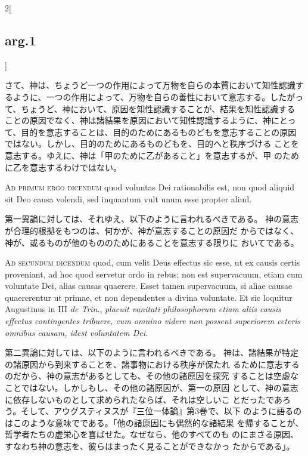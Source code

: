 \documentclass[paper=a4paper,fontsize=10pt,jafontsize=9pt,titlepage]{jlreq}
\begin{document}
\begin{paracol}{2}[\subsection{arg.1}]
\switchcolumn

さて、神は、ちょうど一つの作用によって万物を自らの本質において知性認識す
 るように、一つの作用によって、万物を自らの善性において意志する。したがっ
 て、ちょうど、神において、原因を知性認識することが、結果を知性認識する
 ことの原因でなく、神は諸結果を原因において知性認識するように、神にとっ
 て、目的を意志することは、目的のためにあるものどもを意志することの原因
 ではない。しかし、目的のためにあるものどもを、目的へと秩序づける
 ことを意志する。ゆえに、神は「甲のために乙があること」を意志するが、甲
 のために乙を意志するわけではない。

\switchcolumn*[\subsection{ad.1}]


{\scshape Ad primum ergo dicendum} quod voluntas Dei
rationabilis est, non quod aliquid sit Deo causa volendi, sed inquantum
vult unum esse propter aliud.

\switchcolumn

第一異論に対しては、それゆえ、以下のように言われるべきである。
神の意志が合理的根拠をもつのは、何かが、神が意志することの原因だ
 からではなく、神が、或るものが他のもののためにあることを意志する限りに
 おいてである。

\switchcolumn*[\subsection{ad.2}]


{\scshape Ad secundum dicendum} quod, cum velit Deus
effectus sic esse, ut ex causis certis proveniant, ad hoc quod servetur
ordo in rebus; non est supervacuum, etiam cum voluntate Dei, alias
causas quaerere. Esset tamen supervacuum, si aliae causae quaererentur
ut primae, et non dependentes a divina voluntate. Et sic loquitur
Augustinus in III {\itshape de Trin}., {\itshape placuit vanitati philosophorum etiam aliis
causis effectus contingentes tribuere, cum omnino videre non possent
superiorem ceteris omnibus causam, idest voluntatem Dei}.

\switchcolumn

第二異論に対しては、以下のように言われるべきである。
神は、諸結果が特定の諸原因から到来することを、諸事物における秩序が保たれ
 るために意志するのだから、神の意志があるとしても、その他の諸原因を探究
 することは空虚なことではない。しかしもし、その他の諸原因が、第一の原因
 として、神の意志に依存しないものとして求められたならば、それは空しいこ
 とだったであろう。そして、アウグスティヌスが『三位一体論』第3巻で、以下
 のように語るのはこのような意味でである。「他の諸原因にも偶然的な諸結果
 を帰することが、哲学者たちの虚栄心を喜ばせた。なぜなら、他のすべてのも
 のにまさる原因、すなわち神の意志を、彼らはまったく見ることができなかっ
 たからである」。


\end{paracol}
\end{document}
